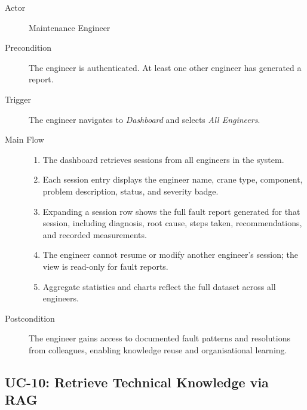 \begin{description}
    \item[Actor] Maintenance Engineer
    \item[Precondition] The engineer is authenticated. At least one other engineer has
                        generated a report.
    \item[Trigger] The engineer navigates to \textit{Dashboard} and selects
                   \textit{All Engineers}.
    \item[Main Flow]
        \begin{enumerate}[noitemsep]
            \item The dashboard retrieves sessions from all engineers in the system.
            \item Each session entry displays the engineer name, crane type, component,
                  problem description, status, and severity badge.
            \item Expanding a session row shows the full fault report generated for
                  that session, including diagnosis, root cause, steps taken,
                  recommendations, and recorded measurements.
            \item The engineer cannot resume or modify another engineer's session;
                  the view is read-only for fault reports.
            \item Aggregate statistics and charts reflect the full dataset across
                  all engineers.
        \end{enumerate}
    \item[Postcondition]
        The engineer gains access to documented fault patterns and resolutions from
        colleagues, enabling knowledge reuse and organisational learning.
\end{description}

\subsection{UC-10: Retrieve Technical Knowledge via RAG\label{sec:uc10}}

